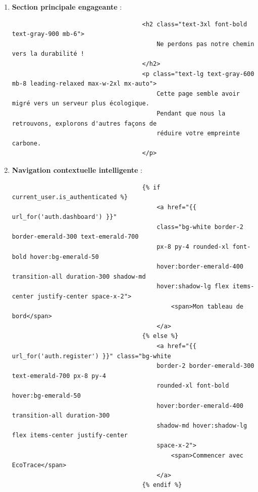 \documentclass[a4paper,11pt]{article}
\begin{document}
\begin{enumerate}
                        \item \textbf{Section principale engageante} :
                            \begin{tcolorbox}[colback=lightgray!5, colframe=gray!80, left=-70mm, right=5mm, top=2mm, bottom=0mm, boxrule=0.1mm]
                                \begin{verbatim}
                                    <h2 class="text-3xl font-bold text-gray-900 mb-6">
                                        Ne perdons pas notre chemin vers la durabilité !
                                    </h2>
                                    <p class="text-lg text-gray-600 mb-8 leading-relaxed max-w-2xl mx-auto">
                                        Cette page semble avoir migré vers un serveur plus écologique. 
                                        Pendant que nous la retrouvons, explorons d'autres façons de 
                                        réduire votre empreinte carbone.
                                    </p>
                                \end{verbatim}
                            \end{tcolorbox}

                        \item \textbf{Navigation contextuelle intelligente} :
                            \begin{tcolorbox}[colback=lightgray!5, colframe=gray!80, left=-70mm, right=5mm, top=2mm, bottom=0mm, boxrule=0.1mm]
                                \begin{verbatim}
                                    {% if current_user.is_authenticated %}
                                        <a href="{{ url_for('auth.dashboard') }}" 
                                        class="bg-white border-2 border-emerald-300 text-emerald-700 
                                        px-8 py-4 rounded-xl font-bold hover:bg-emerald-50 
                                        hover:border-emerald-400 transition-all duration-300 shadow-md 
                                        hover:shadow-lg flex items-center justify-center space-x-2">
                                            <span>Mon tableau de bord</span>
                                        </a>
                                    {% else %}
                                        <a href="{{ url_for('auth.register') }}" class="bg-white 
                                        border-2 border-emerald-300 text-emerald-700 px-8 py-4 
                                        rounded-xl font-bold hover:bg-emerald-50 
                                        hover:border-emerald-400 transition-all duration-300 
                                        shadow-md hover:shadow-lg flex items-center justify-center 
                                        space-x-2">
                                            <span>Commencer avec EcoTrace</span>
                                        </a>
                                    {% endif %}
                                \end{verbatim}
                            \end{tcolorbox}


\end{enumerate}
\end{document}
